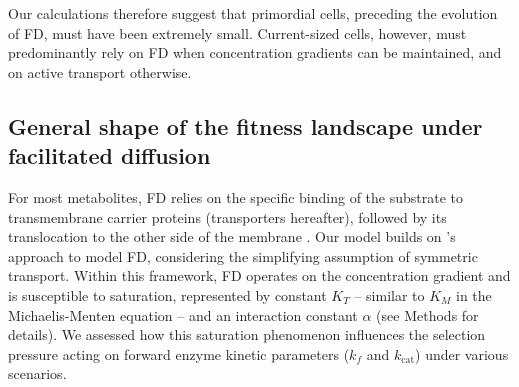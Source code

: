 \documentclass[11pt,onecolumn]{article}
\providecommand{\DIFadd}[1]{{\protect\color{blue} \sf #1}} %
\providecommand{\DIFdel}[1]{{\protect\color{red} \scriptsize #1}} %
\providecommand{\DIFaddbegin}{} %
\providecommand{\DIFaddend}{} %
\providecommand{\DIFdelbegin}{} %
\providecommand{\DIFdelend}{} %
\begin{document}
\DIFdelbegin \DIFdel{Our calculations therefore suggest that primordial cells, preceding the evolution of FD, must have been extremely small. Current-sized cells, however, must predominantly rely on FD when concentration gradients can be maintained, and on active transport otherwise. 
}%

\DIFdelend \subsection{General shape of the fitness landscape under facilitated diffusion}

For most metabolites, FD relies on the specific binding of the substrate to transmembrane carrier proteins (transporters hereafter), followed by its translocation to the other side of the membrane \citep{danielli1954,Kotyk67,Stein86d}. Our model builds on \citet{Kuile94}'s approach to model FD, considering the simplifying assumption of symmetric transport. Within this framework, FD operates on the concentration gradient \DIFaddbegin \DIFadd{\citep{Bosdriesz18} }\DIFaddend and is susceptible to saturation, represented by constant $K_T$ -- similar to $K_M$ in the Michaelis-Menten equation -- and an interaction constant $\alpha$ (see Methods for details). We assessed how this saturation phenomenon influences the selection pressure acting on forward enzyme kinetic parameters ($k_f$ and $k_\text{cat}$) under various scenarios. 
\end{document}
